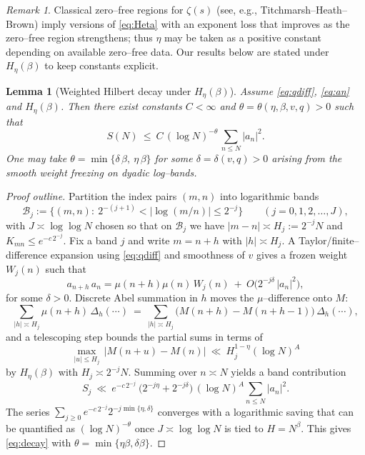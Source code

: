 \documentclass[11pt]{article}
\newtheorem{lemma}{Lemma}
\theoremstyle{remark}
\newtheorem{remark}{Remark}
\begin{document}
\begin{remark}
Classical zero--free regions for $\zeta(s)$ (see, e.g., Titchmarsh--Heath--Brown) imply versions of \eqref{eq:Heta} with an exponent loss that improves as the zero--free region strengthens; thus $\eta$ may be taken as a positive constant depending on available zero--free data.
Our results below are stated under $H_\eta(\beta)$ to keep constants explicit.
\end{remark}

\begin{lemma}[Weighted Hilbert decay under $H_\eta(\beta)$]\label{lem:decay}
Assume \eqref{eq:qdiff}, \eqref{eq:an} and $H_\eta(\beta)$.
Then there exist constants $C<\infty$ and $\theta=\theta(\eta,\beta,v,q)>0$ such that
\begin{equation}\label{eq:decay}
S(N)\ \le\ C\,(\log N)^{-\theta}\,\sum_{n\le N}|a_n|^2.
\end{equation}
One may take $\theta=\min\{\delta\,\beta,\ \eta\,\beta\}$ for some $\delta=\delta(v,q)>0$ arising from the smooth weight freezing on dyadic log--bands.
\end{lemma}

\begin{proof}[Proof outline]
Partition the index pairs $(m,n)$ into logarithmic bands
\[
\mathcal{B}_j:=\Big\{(m,n):\ 2^{-(j+1)}<|\log(m/n)|\le 2^{-j}\Big\}\qquad (j=0,1,2,\dots,J),
\]
with $J\asymp \log\log N$ chosen so that on $\mathcal{B}_j$ we have $|m-n|\asymp H_j:=2^{-j}N$ and $K_{mn}\le e^{-c\,2^{-j}}$.
Fix a band $j$ and write $m=n+h$ with $|h|\asymp H_j$.
A Taylor/finite--difference expansion using \eqref{eq:qdiff} and smoothness of $v$ gives a frozen weight $W_j(n)$ such that
\[
a_{n+h}\,a_n = \mu(n+h)\mu(n)\,W_j(n)\ +\ O\!\big(2^{-j\delta}\,|a_n|^2\big),
\]
for some $\delta>0$.
Discrete Abel summation in $h$ moves the $\mu$--difference onto $M$:
\[
\sum_{|h|\asymp H_j}\mu(n+h)\, \Delta_h(\cdots)\ =\ \sum_{|h|\asymp H_j} \big(M(n+h)-M(n+h-1)\big)\, \Delta_h(\cdots),
\]
and a telescoping step bounds the partial sums in terms of
\[
\max_{|u|\le H_j}\,|M(n+u)-M(n)|\ \ll\ H_j^{1-\eta}(\log N)^A
\]
by $H_\eta(\beta)$ with $H_j\asymp 2^{-j}N$.
Summing over $n\asymp N$ yields a band contribution
\[
S_j\ \ll\ e^{-c\,2^{-j}}\ \Big(2^{-j\eta}+2^{-j\delta}\Big)\,(\log N)^A \sum_{n\le N}|a_n|^2.
\]
The series $\sum_{j\ge 0} e^{-c\,2^{-j}}2^{-j\min\{\eta,\delta\}}$ converges with a logarithmic saving that can be quantified as $(\log N)^{-\theta}$ once $J\asymp\log\log N$ is tied to $H=N^{\beta}$.
This gives \eqref{eq:decay} with $\theta=\min\{\eta\beta,\delta\beta\}$.
\end{proof}
\end{document}
